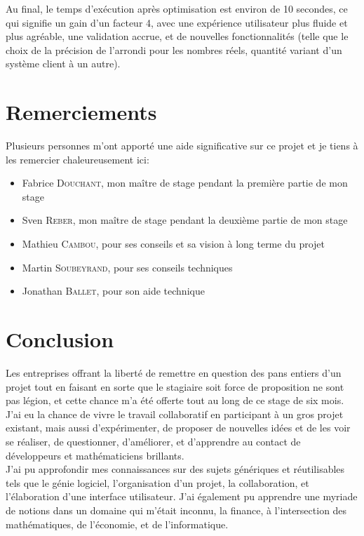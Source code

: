 \documentclass[a4paper,french,12pt]{article}
\begin{document}
	Au final, le temps d'exécution après optimisation est environ de 10 secondes, ce qui signifie un gain d'un facteur 4, avec une expérience utilisateur plus fluide et plus agréable, une validation accrue, et de nouvelles fonctionnalités (telle que le choix de la précision de l'arrondi pour les nombres réels, quantité variant d'un système client à un autre).
   


\section{Remerciements}

	Plusieurs personnes m’ont apporté une aide significative sur ce projet et je tiens à les remercier chaleureusement ici:~\\	

	\begin{itemize} 
		\item Fabrice \textsc{Douchant}, mon maître de stage pendant la première partie de mon stage
		\item Sven \textsc{Reber}, mon maître de stage pendant la deuxième partie de mon stage
		\item Mathieu \textsc{Cambou}, pour ses conseils et sa vision à long terme du projet
		\item Martin \textsc{Soubeyrand}, pour ses conseils techniques
		\item Jonathan \textsc{Ballet}, pour son aide technique
	\end{itemize}

\section{Conclusion}
	Les entreprises offrant la liberté de remettre en question des pans entiers d'un projet tout en faisant en sorte que le stagiaire soit force de proposition ne sont pas légion, et cette chance m'a été offerte tout au long de ce stage de six mois.
J'ai eu la chance de vivre le travail collaboratif en participant à un gros projet existant, mais aussi d'expérimenter, de proposer de nouvelles idées et de les voir se réaliser, de questionner, d'améliorer, et d'apprendre au contact de développeurs et mathématiciens brillants.~\\

	J'ai pu approfondir mes connaissances sur des sujets génériques et réutilisables tels que le génie logiciel, l'organisation d'un projet, la collaboration, et l'élaboration d'une interface utilisateur. J'ai également pu apprendre une myriade de notions dans un domaine qui m'était inconnu, la finance, à l'intersection des mathématiques, de l'économie, et de l'informatique.~\\
	
\end{document}
